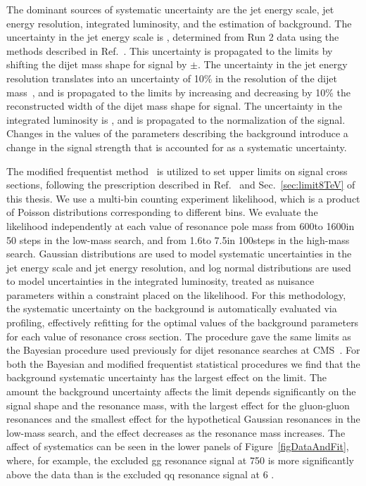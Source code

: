 The dominant sources of systematic uncertainty are the jet energy scale, jet energy resolution,
integrated luminosity, and the estimation of background. The uncertainty in the jet energy scale is \jecUncert,
determined from Run 2 data using the methods described in Ref.~\cite{Chatrchyan:2011ds}.
This uncertainty is propagated to the limits by shifting the dijet mass shape for signal by $\pm$\jecUncert.
The uncertainty in the jet energy
resolution translates into an uncertainty of 10\% in the resolution of the dijet
mass~\cite{Chatrchyan:2011ds}, and is propagated to the limits by increasing and decreasing by 10\% the reconstructed
width of the dijet mass shape for signal.
The uncertainty in the
integrated luminosity is \lumiUncert, and is propagated to the normalization of
the signal.
Changes in the values of the parameters describing the background introduce a change in the signal strength
that is accounted for as a systematic uncertainty.


The modified frequentist method~\cite{Junk1999,bib-cls} is
utilized to set upper limits on signal cross sections, following the prescription
described in Ref.~\cite{LHCCLs} and Sec.~\ref{sec:limit8TeV} of this thesis.  We use a multi-bin counting experiment likelihood, which is
a product of Poisson distributions corresponding to different bins.
We evaluate the likelihood independently at each value of resonance pole mass from 600\GeV to 1600\GeV in 50\GeV 
steps in the low-mass search, and from 1.6\TeV to 7.5\TeV in 100\GeV steps in the high-mass search. 
Gaussian distributions are used to model systematic uncertainties in the jet energy scale and jet energy
resolution, and log normal distributions are used to model uncertainties in the integrated luminosity, treated as nuisance 
parameters within a constraint placed on the likelihood. For this methodology, the 
systematic uncertainty on the background is automatically evaluated via profiling, effectively 
refitting for the optimal values of the background parameters for each value of resonance cross section.
The procedure gave the same limits as the Bayesian procedure used previously for dijet resonance
searches at CMS~\cite{Khachatryan:2015sja}. For both the Bayesian and modified frequentist statistical procedures 
we find that the background systematic uncertainty has the largest effect on the limit. The amount the
background uncertainty affects the limit depends significantly on the signal shape and the resonance mass, with the largest effect for
the gluon-gluon resonances and the smallest effect for the hypothetical Gaussian resonances in the low-mass search,
and the effect decreases as the resonance mass increases. The affect of systematics can be seen in the lower panels of 
Figure~\ref{figDataAndFit}, where, for example, the excluded gg resonance signal at 750 \GeV is more significantly above the data than 
is the excluded qq resonance signal at 6 \TeV.


